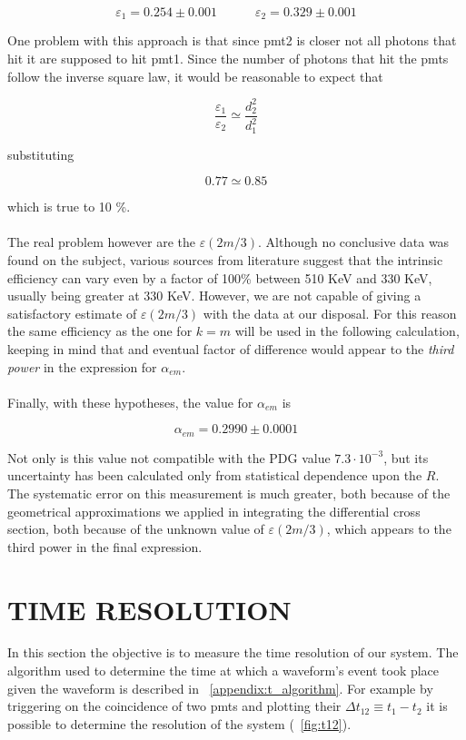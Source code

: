 \documentclass[10pt,a4paper,twocolumn]{article}
\begin{document}
\begin{equation}
    \varepsilon_1= 0.254\pm 0.001 \quad \quad \quad \varepsilon_2= 0.329\pm 0.001
\end{equation}

\noindent One problem with this approach is that since pmt2 is closer not all photons that hit it are supposed to hit pmt1. Since the number of photons that hit the pmts follow the inverse square law, it would be reasonable to expect that

\begin{equation}
    \frac{\varepsilon_1}{\varepsilon_2} \simeq \frac{d_2^2}{d_1^2}
\end{equation}

substituting

$$0.77 \simeq 0.85$$

which is true to 10 \%.
\\
\\
The real problem however are the $\varepsilon(2m/3)$. Although no conclusive data was found on the subject, various sources from literature suggest that the intrinsic efficiency can vary even by a factor of 100\% between 510 KeV and 330 KeV, usually being greater at 330 KeV. However, we are not capable of giving a satisfactory estimate of $\varepsilon(2m/3)$ with the data at our disposal. For this reason the same efficiency as the one for $k=m$ will be used in the following calculation, keeping in mind that and eventual factor of difference would appear to the \textit{third power} in the expression for $\alpha_{em}$.
\\
\\
Finally, with these hypotheses, the value for $\alpha_{em}$ is

\begin{equation}
    \alpha_{em}=  0.2990 \pm   0.0001
\end{equation}

Not only is this value not compatible with the PDG value $7.3 \cdot 10^{-3}$, but its uncertainty has been calculated only from statistical dependence upon the $R$. The systematic error on this measurement is much greater, both because of the geometrical approximations we applied in integrating the differential cross section, both because of the unknown value of $\varepsilon(2m/3)$, which appears to the third power in the final expression.
\section{TIME RESOLUTION}
In this section the objective is to measure the time resolution of our system. The algorithm used to determine the time at which a waveform's event took place given the waveform is described in \appendixname~\ref{appendix:t_algorithm}. For example by triggering on the coincidence of two pmts and plotting their $\Delta t_{12}\equiv t_1-t_2$ it is possible to determine the resolution of the system (\figurename~\ref{fig:t12}).
\end{document}
